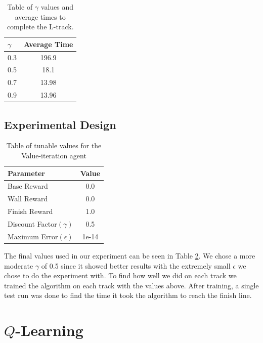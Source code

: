 \documentclass{article}
\begin{document}
	\begin{table}
		\centering
		\begin{tabular}{|l|c|}
			\hline
			$\gamma$ & Average Time \\ \hline
			0.3 & 196.9 \\ 
			0.5 & 18.1 \\
			0.7 & 13.98\\
			0.9 & 13.96 \\ \hline
		\end{tabular}
		\caption{Table of $\gamma$ values and average times to complete the L-track.}
		\label{gamma}
	\end{table}
	\subsection{Experimental Design}
	
	\begin{table}
		\centering
		\begin{tabular}{|l|c|}
			\hline
			Parameter & Value \\ \hline
			Base Reward & 0.0 \\ 
			Wall Reward & 0.0 \\
			Finish Reward & 1.0 \\
			Discount Factor$(\gamma)$ & 0.5 \\
			Maximum Error$(\epsilon)$ & 1e-14 \\ \hline
		\end{tabular}
		\caption{Table of tunable values for the Value-iteration agent}
		\label{stuff}
	\end{table}
	The final values used in our experiment can be seen in Table \ref{stuff}. We chose a more moderate $\gamma$ of 0.5 since it showed better results with the extremely small $\epsilon$ we chose to do the experiment with. To find how well we did on each track we trained the algorithm on each track with the values above. After training, a single test run was done to find the time it took the algorithm to reach the finish line. 
	\section{$Q$-Learning}
\end{document}

